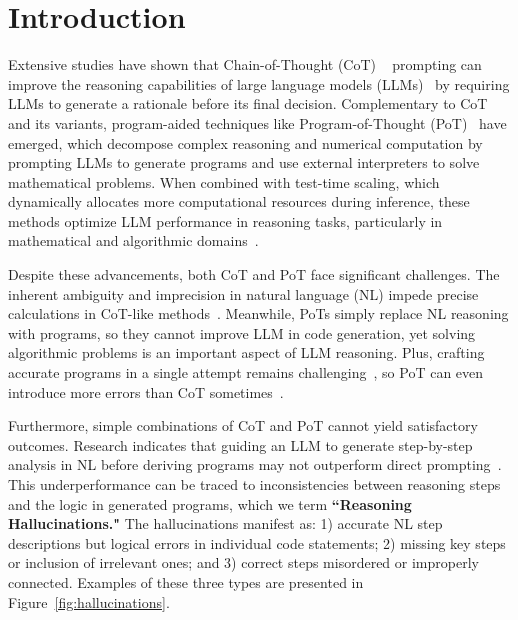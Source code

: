 \section{Introduction}
Extensive studies have shown that Chain-of-Thought (CoT) ~\cite{CoT} prompting can improve the reasoning capabilities of large language models (LLMs)~\cite{SurveyBeyondAcc, SurveyCoTHub, SurveyEvalLogicGPT} by requiring LLMs to generate a rationale before its final decision.
Complementary to CoT and its variants, program-aided techniques like Program-of-Thought (PoT)~\cite{PoT} have emerged, which decompose complex reasoning and numerical computation by prompting LLMs to generate programs and use external interpreters to solve mathematical problems.
When combined with test-time scaling, which dynamically allocates more computational resources during inference, these methods optimize LLM performance in reasoning tasks, particularly in mathematical and algorithmic domains~\cite{Evalo1}.

Despite these advancements, both CoT and PoT face significant challenges.
The inherent ambiguity and imprecision in natural language (NL) impede precise calculations in CoT-like methods~\cite{SurveyNLReason, PAL}.
Meanwhile, PoTs simply replace NL reasoning with programs, so they cannot improve LLM in code generation, yet solving algorithmic problems is an important aspect of LLM reasoning.
Plus, crafting accurate programs in a single attempt remains challenging~\cite{FunCoder}, so PoT can even introduce more errors than CoT sometimes~\cite{HTL}.

Furthermore, simple combinations of CoT and PoT cannot yield satisfactory outcomes. Research indicates that guiding an LLM to generate step-by-step analysis in NL before deriving programs may not outperform direct prompting~\cite{CodeCoT}.
This underperformance can be traced to inconsistencies between reasoning steps and the logic in generated programs, which we term \textbf{``Reasoning Hallucinations."} 
The hallucinations manifest as: 1) accurate NL step descriptions but logical errors in individual code statements; 2) missing key steps or inclusion of irrelevant ones; and 3) correct steps misordered or improperly connected. Examples of these three types are presented in Figure~\ref{fig:hallucinations}.

